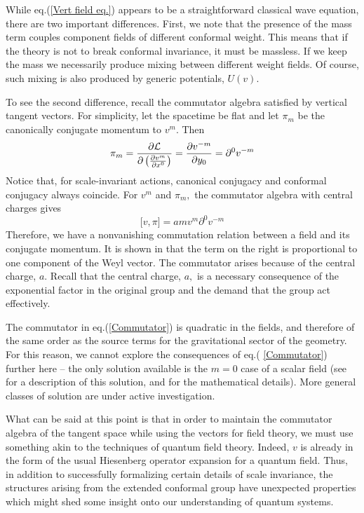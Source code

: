 \documentclass[a4paper,12pt]{article}
\begin{document}
While eq.(\ref{Vert field eq.}) appears to be a straightforward classical
wave equation, there are two important differences. First, we note that the
presence of the mass term couples component fields of different conformal
weight. This means that if the theory is not to break conformal invariance,
it must be massless. If we keep the mass we necessarily produce mixing
between different weight fields. Of course, such mixing is also produced by
generic potentials, $U(v).$

To see the second difference, recall the commutator algebra satisfied by
vertical tangent vectors. For simplicity, let the spacetime be flat and let $%
\pi _{m}$ be the canonically conjugate momentum to $v^{m}.$ Then 
\begin{equation}
\pi _{m}=\frac{\partial \mathcal{L}}{\partial \left( \frac{\partial v^{m}}{%
\partial x^{0}}\right) }=\frac{\partial v^{-m}}{\partial y_{0}}=\partial
^{0}v^{-m}
\end{equation}
Notice that, for scale-invariant actions, canonical conjugacy and conformal
conjugacy always coincide. For $v^{m}$ and $\pi _{m},$ the commutator
algebra with central charges gives 
\begin{equation}
\lbrack v,\pi ]=amv^{m}\partial ^{0}v^{-m}  \label{Commutator}
\end{equation}
Therefore, we have a nonvanishing commutation relation between a field and
its conjugate momentum. It is shown in \cite{WWII} that the term on the
right is proportional to one component of the Weyl vector. The commutator
arises because of the central charge, $a.$ Recall that the central charge, $
a,$ is a necessary consequence of the exponential factor in the original
group and the demand that the group act effectively.

The commutator in eq.(\ref{Commutator}) is quadratic in the fields, and
therefore of the same order as the source terms for the gravitational sector
of the geometry. For this reason, we cannot explore the consequences of eq.(%
\ref{Commutator}) further here -- the only solution available is the $m=0$
case of a scalar field (see \cite{WWIII} for a description of this solution,
and \cite{WWII} for the mathematical details). More general classes of
solution are under active investigation.

What can be said at this point is that in order to maintain the commutator
algebra of the tangent space while using the vectors for field theory, we
must use something akin to the techniques of quantum field theory. Indeed, $%
v $ is already in the form of the usual Hiesenberg operator expansion for a
quantum field$.$ Thus, in addition to successfully formalizing certain
details of scale invariance, the structures arising from the extended
conformal group have unexpected properties which might shed some insight
onto our understanding of quantum systems.
\end{document}
